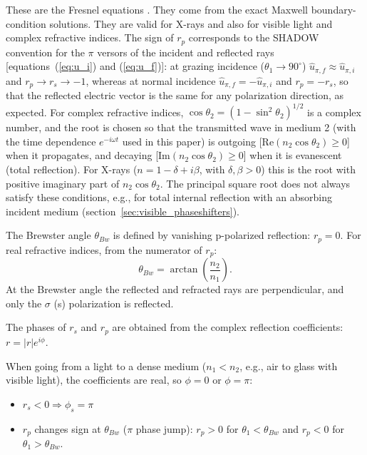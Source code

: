 \documentclass{iucr}
\begin{document}
These are the Fresnel equations \cite{born_wolf}. They come from the exact Maxwell boundary-condition solutions. They are valid for X-rays and also for visible light and complex refractive indices.
The sign of $r_p$ corresponds to the SHADOW convention for the $\pi$ versors of the incident and reflected rays [equations~(\ref{eq:u_i}) and (\ref{eq:u_f})]: at grazing incidence ($\theta_1\rightarrow 90^\circ$) $\hat{u}_{\pi,f}\approx\hat{u}_{\pi,i}$ and $r_p\rightarrow r_s\rightarrow -1$, whereas at normal incidence $\hat{u}_{\pi,f}=-\hat{u}_{\pi,i}$ and $r_p=-r_s$, so that the reflected electric vector is the same for any polarization direction, as expected.
For complex refractive indices, $\cos\theta_2=(1-\sin^2\theta_2)^{1/2}$ is a complex number, and the root is chosen so that the transmitted wave in medium 2 (with the time dependence $e^{-i\omega t}$ used in this paper) is outgoing [$\mathrm{Re}(n_2\cos\theta_2)\geq0$] when it propagates, and decaying [$\mathrm{Im}(n_2\cos\theta_2)\geq0$] when it is evanescent (total reflection). For X-rays ($n = 1 - \delta + i\beta$, with $\delta,\beta>0$) this is the root with positive imaginary part of $n_2\cos\theta_2$. The principal square root does not always satisfy these conditions, e.g., for total internal reflection with an absorbing incident medium (section~\ref{sec:visible_phaseshifters}).

The Brewster angle $\theta_{Bw}$ is defined by vanishing p-polarized reflection: $r_p = 0$.
For real refractive indices, from the numerator of $r_p$:
\begin{equation}
\theta_{Bw} = \arctan\left(\frac{n_2}{n_1}\right).
\end{equation}
At the Brewster angle the reflected and refracted rays are perpendicular, and only the $\sigma$ (s) polarization is reflected.

The phases of $r_s$ and $r_p$ are
obtained from the complex
reflection coefficients:
$r = |r| e^{i\phi}$.

When going from a light to a dense medium ($n_1<n_2$, e.g., air to glass with visible light), the coefficients are real, so $\phi = 0$ or $\phi = \pi$:
\begin{itemize}
\item $r_s < 0 \Rightarrow \phi_s = \pi$
\item $r_p$ changes sign at $\theta_{Bw}$ ($\pi$ phase jump): $r_p>0$ for $\theta_1<\theta_{Bw}$ and $r_p<0$ for $\theta_1>\theta_{Bw}$.
\end{itemize}
\end{document}
